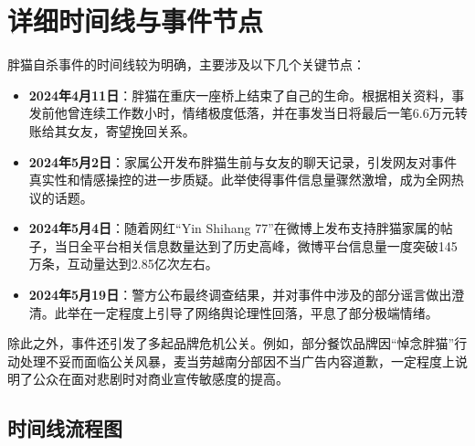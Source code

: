 \documentclass{article}
\begin{document}
\section{详细时间线与事件节点}
胖猫自杀事件的时间线较为明确，主要涉及以下几个关键节点：
\begin{itemize}
    \item \textbf{2024年4月11日}：胖猫在重庆一座桥上结束了自己的生命。根据相关资料，事发前他曾连续工作数小时，情绪极度低落，并在事发当日将最后一笔6.6万元转账给其女友，寄望挽回关系。
    \item \textbf{2024年5月2日}：家属公开发布胖猫生前与女友的聊天记录，引发网友对事件真实性和情感操控的进一步质疑。此举使得事件信息量骤然激增，成为全网热议的话题。
    \item \textbf{2024年5月4日}：随着网红“Yin Shihang 77”在微博上发布支持胖猫家属的帖子，当日全平台相关信息数量达到了历史高峰，微博平台信息量一度突破145万条，互动量达到2.85亿次左右。
    \item \textbf{2024年5月19日}：警方公布最终调查结果，并对事件中涉及的部分谣言做出澄清。此举在一定程度上引导了网络舆论理性回落，平息了部分极端情绪。
\end{itemize}
除此之外，事件还引发了多起品牌危机公关。例如，部分餐饮品牌因“悼念胖猫”行动处理不妥而面临公关风暴，麦当劳越南分部因不当广告内容道歉，一定程度上说明了公众在面对悲剧时对商业宣传敏感度的提高。

\subsection{时间线流程图}
\begin{center}
\end{center}
\end{document}
